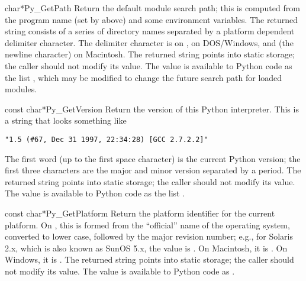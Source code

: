 \documentclass{manual}
\begin{document}
\begin{cfuncdesc}{char*}{Py_GetPath}{}
Return the default module search path; this is computed from the 
program name (set by  above) and some 
environment variables.  The returned string consists of a series of 
directory names separated by a platform dependent delimiter character.  
The delimiter character is \character{:} on \UNIX{}, \character{;} on
DOS/Windows, and  (the \ASCII{} newline character) on
Macintosh.  The returned string points into static storage; the caller
should not modify its value.  The value is available to Python code 
as the list ,
which may be modified to change the future search path for loaded
modules.

\end{cfuncdesc}

\begin{cfuncdesc}{const char*}{Py_GetVersion}{}
Return the version of this Python interpreter.  This is a string that 
looks something like

\begin{verbatim}
"1.5 (#67, Dec 31 1997, 22:34:28) [GCC 2.7.2.2]"
\end{verbatim}

The first word (up to the first space character) is the current Python 
version; the first three characters are the major and minor version 
separated by a period.  The returned string points into static storage; 
the caller should not modify its value.  The value is available to 
Python code as the list .
\end{cfuncdesc}

\begin{cfuncdesc}{const char*}{Py_GetPlatform}{}
Return the platform identifier for the current platform.  On \UNIX{}, 
this is formed from the ``official'' name of the operating system, 
converted to lower case, followed by the major revision number; e.g., 
for Solaris 2.x, which is also known as SunOS 5.x, the value is 
.  On Macintosh, it is .  On Windows, it 
is .  The returned string points into static storage; 
the caller should not modify its value.  The value is available to 
Python code as .
\end{cfuncdesc}
\end{document}
